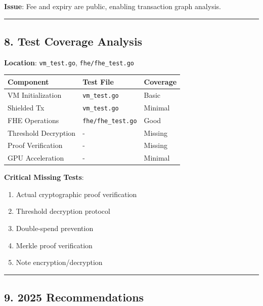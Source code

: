 \documentclass[
]{article}
\newcounter{none} %
\providecommand{\tightlist}{%
  \setlength{\itemsep}{0pt}\setlength{\parskip}{0pt}}
\begin{document}
\textbf{Issue}: Fee and expiry are public, enabling transaction graph
analysis.

\begin{center}\rule{0.5\linewidth}{0.5pt}\end{center}

\subsection{8. Test Coverage Analysis}\label{8-test-coverage-analysis}

\textbf{Location}: \texttt{vm\_test.go}, \texttt{fhe/fhe\_test.go}

{\def\LTcaptype{none} %
\begin{longtable}[]{@{}lll@{}}
\toprule\noalign{}
Component & Test File & Coverage \\
\midrule\noalign{}
\endhead
\bottomrule\noalign{}
\endlastfoot
VM Initialization & \texttt{vm\_test.go} & Basic \\
Shielded Tx & \texttt{vm\_test.go} & Minimal \\
FHE Operations & \texttt{fhe/fhe\_test.go} & Good \\
Threshold Decryption & - & Missing \\
Proof Verification & - & Missing \\
GPU Acceleration & - & Minimal \\
\end{longtable}
}

\textbf{Critical Missing Tests}:

\begin{enumerate}
\def\labelenumi{\arabic{enumi}.}
\tightlist
\item
  Actual cryptographic proof verification
\item
  Threshold decryption protocol
\item
  Double-spend prevention
\item
  Merkle proof verification
\item
  Note encryption/decryption
\end{enumerate}

\begin{center}\rule{0.5\linewidth}{0.5pt}\end{center}

\subsection{9. 2025 Recommendations}\label{9-2025-recommendations}
\end{document}
